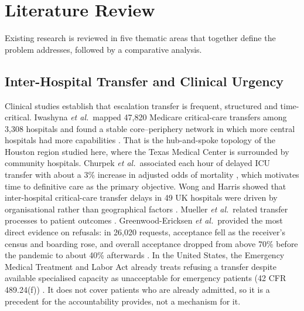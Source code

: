 \section{Literature Review}
\label{sec:literature}

Existing research is reviewed in five thematic areas that together define the problem \mahros{} addresses, followed by a comparative analysis.

\subsection{Inter-Hospital Transfer and Clinical Urgency}
Clinical studies establish that escalation transfer is frequent, structured and time-critical. Iwashyna \emph{et al.}\ mapped 47,820 Medicare critical-care transfers among 3,308 hospitals and found a stable core--periphery network in which more central hospitals had more capabilities \cite{iwashyna2009networks}. That is the hub-and-spoke topology of the Houston region studied here, where the Texas Medical Center is surrounded by community hospitals. Churpek \emph{et al.}\ associated each hour of delayed ICU transfer with about a 3\% increase in adjusted odds of mortality \cite{churpek2016delay}, which motivates time to definitive care as the primary objective. Wong and Harris showed that inter-hospital critical-care transfer delays in 49 UK hospitals were driven by organisational rather than geographical factors \cite{wong2015delays}. Mueller \emph{et al.}\ related transfer processes to patient outcomes \cite{mueller2019transfer}. Greenwood-Ericksen \emph{et al.}\ provided the most direct evidence on refusals: in 26,020 requests, acceptance fell as the receiver's census and boarding rose, and overall acceptance dropped from above 70\% before the pandemic to about 40\% afterwards \cite{greenwood2025boarding}. In the United States, the Emergency Medical Treatment and Labor Act already treats refusing a transfer despite available specialised capacity as unacceptable for emergency patients (42 CFR 489.24(f)) \cite{emtala489}. It does not cover patients who are already admitted, so it is a precedent for the accountability \mahros{} provides, not a mechanism for it.

